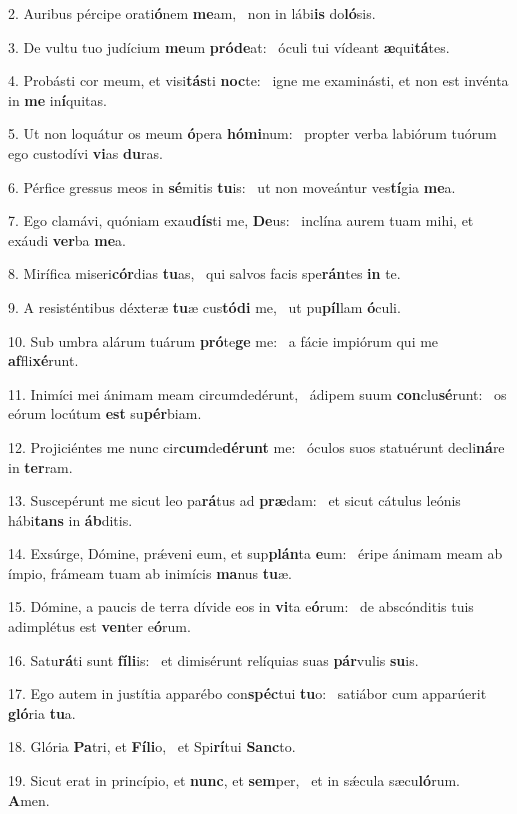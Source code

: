 2. Auribus pércipe orati\textbf{ó}nem \textbf{me}am, \ast\  non in lábi\textbf{is} do\textbf{ló}sis.\

3. De vultu tuo judícium \textbf{me}um \textbf{pród}\textbf{e}at: \ast\  óculi tui vídeant \textbf{æ}qui\textbf{tá}tes.\

4. Probásti cor meum, et visi\textbf{tás}ti \textbf{noc}te: \ast\  igne me examinásti, et non est invénta in \textbf{me} in\textbf{í}quitas.\

5. Ut non loquátur os meum \textbf{ó}pera \textbf{hó}\textbf{mi}num: \ast\  propter verba labiórum tuórum ego custodívi \textbf{vi}as \textbf{du}ras.\

6. Pérfice gressus meos in \textbf{sé}mitis \textbf{tu}is: \ast\  ut non moveántur ves\textbf{tí}gia \textbf{me}a.\

7. Ego clamávi, quóniam exau\textbf{dís}ti me, \textbf{De}us: \ast\  inclína aurem tuam mihi, et exáudi \textbf{ver}ba \textbf{me}a.\

8. Mirífica miseri\textbf{cór}dias \textbf{tu}as, \ast\  qui salvos facis spe\textbf{rán}tes \textbf{in} te.\

9. A resisténtibus déxteræ \textbf{tu}æ cus\textbf{tó}\textbf{di} me, \ast\  ut pu\textbf{píl}lam \textbf{ó}culi.\

10. Sub umbra alárum tuárum \textbf{pró}te\textbf{ge} me: \ast\  a fácie impiórum qui me \textbf{af}fli\textbf{xé}runt.\

11. Inimíci mei ánimam meam circumdedérunt, \dag\  ádipem suum \textbf{con}clu\textbf{sé}runt: \ast\  os eórum locútum \textbf{est} su\textbf{pér}biam.\

12. Projiciéntes me nunc cir\textbf{cum}de\textbf{dé}\textbf{runt} me: \ast\  óculos suos statuérunt decli\textbf{ná}re in \textbf{ter}ram.\

13. Suscepérunt me sicut leo pa\textbf{rá}tus ad \textbf{præ}dam: \ast\  et sicut cátulus leónis hábi\textbf{tans} in \textbf{áb}ditis.\

14. Exsúrge, Dómine, prǽveni eum, et sup\textbf{plán}ta \textbf{e}um: \ast\  éripe ánimam meam ab ímpio, frámeam tuam ab inimícis \textbf{ma}nus \textbf{tu}æ.\

15. Dómine, a paucis de terra dívide eos in \textbf{vi}ta e\textbf{ó}rum: \ast\  de abscónditis tuis adimplétus est \textbf{ven}ter e\textbf{ó}rum.\

16. Satu\textbf{rá}ti sunt \textbf{fí}\textbf{li}is: \ast\  et dimisérunt relíquias suas \textbf{pár}vulis \textbf{su}is.\

17. Ego autem in justítia apparébo con\textbf{spéc}tui \textbf{tu}o: \ast\  satiábor cum apparúerit \textbf{gló}ria \textbf{tu}a.\

18. Glória \textbf{Pa}tri, et \textbf{Fí}\textbf{li}o, \ast\  et Spi\textbf{rí}tui \textbf{Sanc}to.\

19. Sicut erat in princípio, et \textbf{nunc}, et \textbf{sem}per, \ast\  et in sǽcula sæcu\textbf{ló}rum. \textbf{A}men.\

